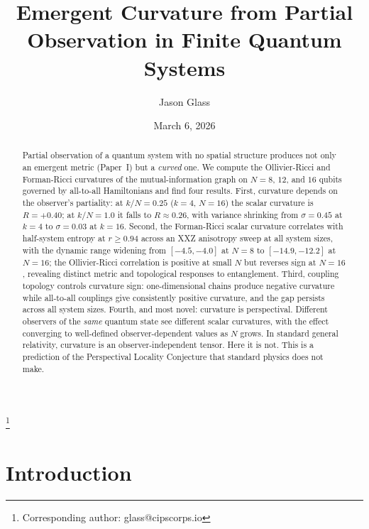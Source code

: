 \documentclass[aps,pra,twocolumn,superscriptaddress]{revtex4-2}
\begin{document}
\title{Emergent Curvature from Partial Observation in Finite Quantum Systems}

\author{Jason Glass}
\thanks{Corresponding author: glass@cipscorps.io}

\date{March 6, 2026}

\begin{abstract}
Partial observation of a quantum system with no spatial structure produces not only an emergent metric (Paper~I) but a \emph{curved} one. We compute the Ollivier-Ricci and Forman-Ricci curvatures of the mutual-information graph on $N = 8$, $12$, and $16$ qubits governed by all-to-all Hamiltonians and find four results. First, curvature depends on the observer's partiality: at $k/N = 0.25$ ($k = 4$, $N = 16$) the scalar curvature is $R = +0.40$; at $k/N = 1.0$ it falls to $R \approx 0.26$, with variance shrinking from $\sigma = 0.45$ at $k = 4$ to $\sigma = 0.03$ at $k = 16$. Second, the Forman-Ricci scalar curvature correlates with half-system entropy at $r \geq 0.94$ across an XXZ anisotropy sweep at all system sizes, with the dynamic range widening from $[-4.5, -4.0]$ at $N = 8$ to $[-14.9, -12.2]$ at $N = 16$; the Ollivier-Ricci correlation is positive at small $N$ but reverses sign at $N = 16$, revealing distinct metric and topological responses to entanglement. Third, coupling topology controls curvature sign: one-dimensional chains produce negative curvature while all-to-all couplings give consistently positive curvature, and the gap persists across all system sizes. Fourth, and most novel: curvature is perspectival. Different observers of the \emph{same} quantum state see different scalar curvatures, with the effect converging to well-defined observer-dependent values as $N$ grows. In standard general relativity, curvature is an observer-independent tensor. Here it is not. This is a prediction of the Perspectival Locality Conjecture that standard physics does not make.
\end{abstract}

\maketitle

\section{Introduction}
\end{document}
